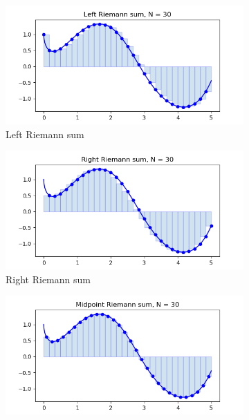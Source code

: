 \begin{figure}[H]
    \centering
    \begin{subfigure}[b]{0.45\textwidth}
        \includegraphics[width=\textwidth]{figure/riemann_left.png}
        \caption{Left Riemann sum}
    \end{subfigure}
    \begin{subfigure}[b]{0.45\textwidth}
        \includegraphics[width=\textwidth]{figure/riemann_right.png}
        \caption{Right Riemann sum}
    \end{subfigure}
    \begin{subfigure}[b]{0.45\textwidth}
        \includegraphics[width=\textwidth]{figure/riemann_mid.png}

\end{subfigure}
\end{figure}
